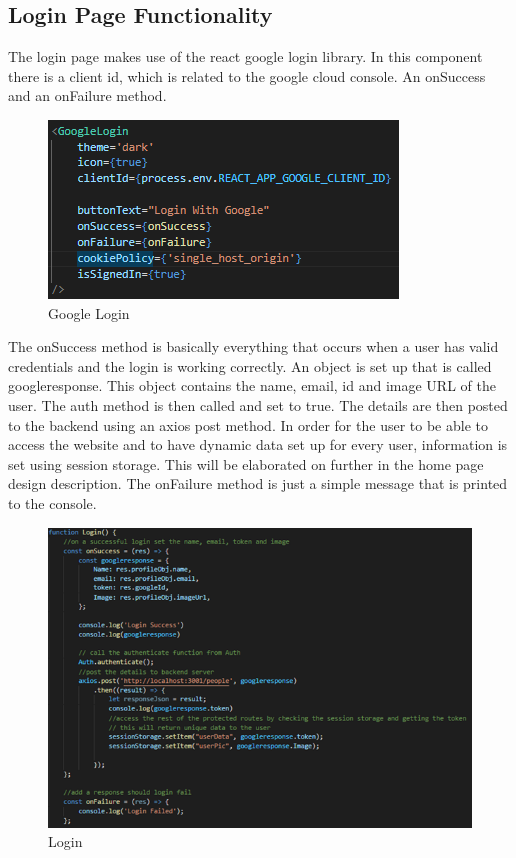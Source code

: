 \subsection{Login Page Functionality}
The login page makes use of the react google login library. In this component there is a client id, which is related to the google cloud console. An onSuccess and an onFailure method. \\
\begin{figure}[H]
    \centering
    \includegraphics{img/GoogleLogin.png}
    \caption{Google Login}
    \label{fig:my_label}
\end{figure}

The onSuccess method is basically everything that occurs when a user has valid credentials and the login is working correctly. An object is set up that is called googleresponse. This object contains the name, email, id and image URL of the user. The auth method is then called and set to true. The details are then posted to the backend using an axios post method. In order for the user to be able to access the website and to have dynamic data set up for every user, information is set using session storage. This will be elaborated on further in the home page design description. The onFailure method is just a simple message that is printed to the console. \\
\begin{figure}[H]
    \centering
    \includegraphics{img/Login1.png}
    \caption{Login}
    \label{fig:my_label}
\end{figure}

